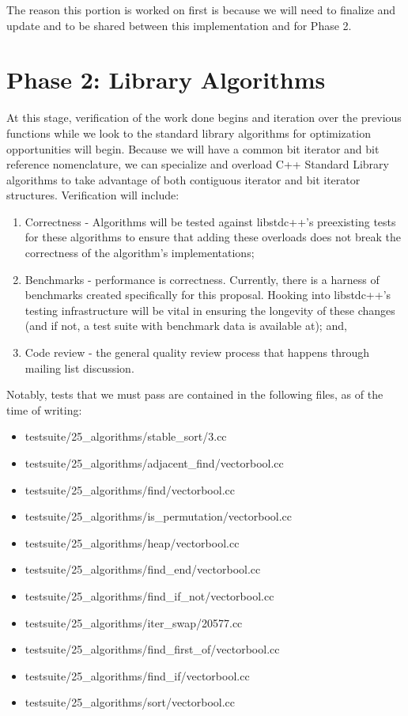 \documentclass{wg21}
\begin{document}
The reason this portion is worked on first is because we will need to finalize and update  and  to be shared between this implementation and  for Phase 2.


\section[phase2]{Phase 2: Library Algorithms}

At this stage, verification of the work done begins and iteration over the previous functions while we look to the standard library algorithms for optimization opportunities will begin. Because we will have a common bit iterator and bit reference nomenclature, we can specialize and overload C++ Standard Library algorithms to take advantage of both contiguous iterator and bit iterator structures. Verification will include:

\begin{enumerate}  
	\item Correctness - Algorithms will be tested against libstdc++'s preexisting tests for these algorithms to ensure that adding these overloads does not break the correctness of the algorithm's implementations;
	\item Benchmarks - performance is correctness. Currently, there is a harness of benchmarks created specifically for this proposal. Hooking into libstdc++'s testing infrastructure will be vital in ensuring the longevity of these changes (and if not, a test suite with benchmark data is available at\cite{bit_proposal_gsoc2019}); and,
	\item Code review - the general quality review process that happens through mailing list discussion.
\end{enumerate}

Notably, tests that we must pass are contained in the following files, as of the time of writing:

\begin{itemize}
	\item testsuite/25_algorithms/stable_sort/3.cc
	\item testsuite/25_algorithms/adjacent_find/vectorbool.cc
	\item testsuite/25_algorithms/find/vectorbool.cc
	\item testsuite/25_algorithms/is_permutation/vectorbool.cc
	\item testsuite/25_algorithms/heap/vectorbool.cc
	\item testsuite/25_algorithms/find_end/vectorbool.cc
	\item testsuite/25_algorithms/find_if_not/vectorbool.cc
	\item testsuite/25_algorithms/iter_swap/20577.cc
	\item testsuite/25_algorithms/find_first_of/vectorbool.cc
	\item testsuite/25_algorithms/find_if/vectorbool.cc
	\item testsuite/25_algorithms/sort/vectorbool.cc
\end{itemize}
\end{document}

